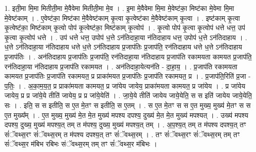 \documentclass[17pt]{extarticle}
\begin{document}
1. इती॒मा मि॒मा मितीती॒मा मे॒वैवेमा मितीती॒मा मे॒व । . इ॒मा मे॒वैवेमा मि॒मा मे॒वेष्ट॑का॒ मिष्ट॑का मे॒वेमा मि॒मा मे॒वेष्ट॑काम् । . ए॒वेष्ट॑का॒ मिष्ट॑का मे॒वैवेष्ट॑काम् कृ॒त्वा कृ॒त्वेष्ट॑का मे॒वैवेष्ट॑काम् कृ॒त्वा । . इष्ट॑काम् कृ॒त्वा कृ॒त्वेष्ट॑का॒ मिष्ट॑काम् कृ॒त्वो पोप॑ कृ॒त्वेष्ट॑का॒ मिष्ट॑काम् कृ॒त्वोप॑ । . कृ॒त्वो पोप॑ कृ॒त्वा कृ॒त्वोप॑ धत्ते धत्त॒ उप॑ कृ॒त्वा कृ॒त्वोप॑ धत्ते । . उप॑ धत्ते धत्त॒ उपोप॑ ध॒त्ते ऽन॑तिदाहा॒या न॑तिदाहाय धत्त॒ उपोप॑ ध॒त्ते ऽन॑तिदाहाय । . ध॒त्ते ऽन॑तिदाहा॒या न॑तिदाहाय धत्ते ध॒त्ते ऽन॑तिदाहाय प्र॒जाप॑तिः प्र॒जाप॑ति॒ रन॑तिदाहाय धत्ते ध॒त्ते ऽन॑तिदाहाय प्र॒जाप॑तिः । . अन॑तिदाहाय प्र॒जाप॑तिः प्र॒जाप॑ति॒ रन॑तिदाहा॒या न॑तिदाहाय प्र॒जाप॑ति रकामयता कामयत प्र॒जाप॑ति॒ रन॑तिदाहा॒या न॑तिदाहाय प्र॒जाप॑ति रकामयत । . अन॑तिदाहा॒येत्यन॑ति - दा॒हा॒य॒ । . प्र॒जाप॑ति रकामयता कामयत प्र॒जाप॑तिः प्र॒जाप॑ति रकामयत॒ प्र प्राका॑मयत प्र॒जाप॑तिः प्र॒जाप॑ति रकामयत॒ प्र । . प्र॒जाप॑ति॒रिति॑ प्र॒जा - प॒तिः॒ । . अ॒का॒म॒य॒त॒ प्र प्राका॑मयता कामयत॒ प्र जा॑येय जायेय॒ प्राका॑मयता कामयत॒ प्र जा॑येय । . प्र जा॑येय जायेय॒ प्र प्र जा॑ये॒ये तीति॑ जायेय॒ प्र प्र जा॑ये॒येति॑ । . जा॒ये॒ये तीति॑ जायेय जाये॒येति॒ स स इति॑ जायेय जाये॒येति॒ सः । . इति॒ स स इतीति॒ स ए॒त मे॒तꣳ स इतीति॒ स ए॒तम् । . स ए॒त मे॒तꣳ स स ए॒त मुख्य॒ मुख्य॑ मे॒तꣳ स स ए॒त मुख्य᳚म् । . ए॒त मुख्य॒ मुख्य॑ मे॒त मे॒त मुख्य॑ मपश्य दपश्य॒ दुख्य॑ मे॒त मे॒त मुख्य॑ मपश्यत् । . उख्य॑ मपश्य दपश्य॒ दुख्य॒ मुख्य॑ मपश्य॒त् तम् त म॑पश्य॒ दुख्य॒ मुख्य॑ मपश्य॒त् तम् । . अ॒प॒श्य॒त् तम् त म॑पश्य दपश्य॒त् तꣳ सं॑ॅवथ्स॒रꣳ सं॑ॅवथ्स॒रम् त म॑पश्य दपश्य॒त् तꣳ सं॑ॅवथ्स॒रम् । . तꣳ सं॑ॅवथ्स॒रꣳ सं॑ॅवथ्स॒रम् तम् तꣳ सं॑ॅवथ्स॒र म॑बिभ रबिभः संॅवथ्स॒रम् तम् तꣳ सं॑ॅवथ्स॒र म॑बिभः । \newline
\end{document}
